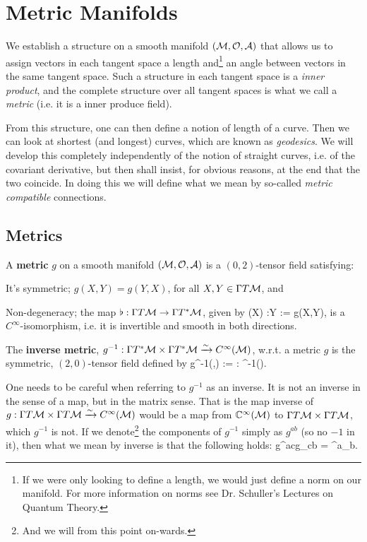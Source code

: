 \chapter{Metric Manifolds}

We establish a structure on a smooth manifold $(\mathcal{M},\mathcal{O},\mathcal{A})$ that allows us to assign vectors in each tangent space a length and\footnote{If we were only looking to define a length, we would just define a norm on our manifold. For more information on norms see Dr. Schuller's Lectures on Quantum Theory.} an angle between vectors in the same tangent space. Such a structure in each tangent space is a \textit{inner product}, and the complete structure over all tangent spaces is what we call a \textit{metric} (i.e. it is a inner produce field). 

From this structure, one can then define a notion of length of a curve. Then we can look at shortest (and longest) curves, which are known as \textit{geodesics}. We will develop this completely independently of the notion of straight curves, i.e. of the  covariant derivative, but then shall insist, for obvious reasons, at the end that the two coincide. In doing this we will define what we mean by so-called \textit{metric compatible} connections.

\section{Metrics}

\bd[Metric]
    A \textbf{metric} $g$ on a smooth manifold $(\mathcal{M},\mathcal{O},\mathcal{A})$ is a $(0,2)$-tensor field satisfying:
    \benr 
        \item It's symmetric; $g(X,Y) = g(Y,X)$, for all $X,Y\in\Gamma T\mathcal{M}$, and
        \item Non-degeneracy; the map $\flat : \Gamma T\mathcal{M}\to \Gamma T^*\mathcal{M}$, given by 
        \bse 
            \flat(X) :Y := g(X,Y),
        \ese 
        is a $C^{\infty}$-isomorphism, i.e. it is invertible and smooth in both directions. 
    \een 
\ed 

    The \textbf{inverse metric}, $g^{-1}:\Gamma T^*\mathcal{M}\times \Gamma T^*\mathcal{M}\xrightarrow{\sim} C^{\infty}(\mathcal{M})$, w.r.t. a metric $g$ is the symmetric, $(2,0)$-tensor field defined by 
    \bse 
        g^{-1}(\omega,\sig) := \omega : \flat^{-1}(\sig).
    \ese 
\ed 

\br 
    One needs to be careful when referring to $g^{-1}$ as an inverse. It is not an inverse in the sense of a map, but in the matrix sense. That is the map inverse of $g:\Gamma T\mathcal{M}\times \Gamma T\mathcal{M}\xrightarrow{\sim} C^{\infty}(\mathcal{M})$ would be a map from $\mathbb{C}^{\infty}(\mathcal{M})$ to $\Gamma T\mathcal{M}\times\Gamma T\mathcal{M}$, which $g^{-1}$ is not. If we denote\footnote{And we will from this point on-wards.} the components of $g^{-1}$ simply as $g^{ab}$ (so no $-1$ in it), then what we mean by inverse is that the following holds:
    \bse 
        g^{ac}g_{cb} = \del^a_b.
    \ese 
\er 

